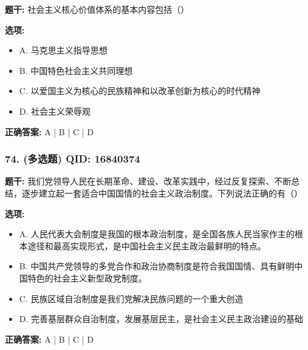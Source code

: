 \documentclass[12pt,UTF8]{ctexart}
\begin{document}
\textbf{题干:}
社会主义核心价值体系的基本内容包括（）

\textbf{选项:}
\begin{itemize}[leftmargin=*]

  \item A. 马克思主义指导思想

  \item B. 中国特色社会主义共同理想

  \item C. 以爱国主义为核心的民族精神和以改革创新为核心的时代精神

  \item D. 社会主义荣辱观

\end{itemize}

\textbf{正确答案:}
A | B | C | D

\vspace{0.3em}\hrulefill\vspace{0.7em}

\subsubsection*{74. (多选题) \small QID: 16840374}

\textbf{题干:}
我们党领导人民在长期革命、建设、改革实践中，经过反复探索、不断总结，逐步建立起一套适合中国国情的社会主义政治制度。下列说法正确的有（）

\textbf{选项:}
\begin{itemize}[leftmargin=*]

  \item A. 人民代表大会制度是我国的根本政治制度，是全国各族人民当家作主的根本途径和最高实现形式，是中国社会主义民主政治最鲜明的特点。

  \item B. 中国共产党领导的多党合作和政治协商制度是符合我国国情、具有鲜明中国特色的社会主义新型政党制度。

  \item C. 民族区域自治制度是我们党解决民族问题的一个重大创造

  \item D. 完善基层群众自治制度，发展基层民主，是社会主义民主政治建设的基础

\end{itemize}

\textbf{正确答案:}
A | B | C | D

\vspace{0.3em}\hrulefill\vspace{0.7em}
\end{document}
